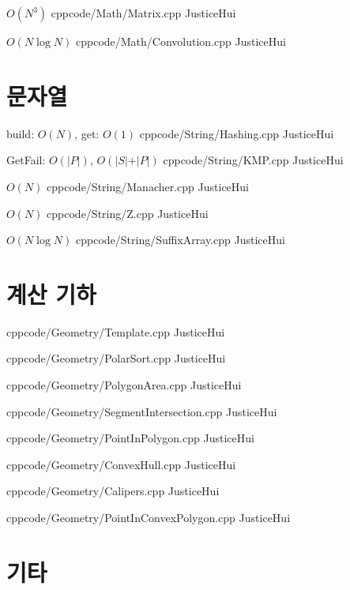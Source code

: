 \documentclass[landscape, 8pt, a4paper, twocolumn]{extarticle} %
\begin{document}
{}{$O(N^3)$}
{cpp}{code/Math/Matrix.cpp}
{JusticeHui}

{}{$O(N \log N)$}
{cpp}{code/Math/Convolution.cpp}
{JusticeHui}

\section{문자열}

{}{build: $O(N)$, get: $O(1)$}
{cpp}{code/String/Hashing.cpp}
{JusticeHui}

{}{GetFail: $O(\vert P\vert)$, $O(\vert S\vert + \vert P\vert)$}
{cpp}{code/String/KMP.cpp}
{JusticeHui}

{}{$O(N)$}
{cpp}{code/String/Manacher.cpp}
{JusticeHui}

{}{$O(N)$}
{cpp}{code/String/Z.cpp}
{JusticeHui}

{}{$O(N \log N)$}
{cpp}{code/String/SuffixArray.cpp}
{JusticeHui}

\section{계산 기하}

{}{}
{cpp}{code/Geometry/Template.cpp}
{JusticeHui}

{}{}
{cpp}{code/Geometry/PolarSort.cpp}
{JusticeHui}

{}{}
{cpp}{code/Geometry/PolygonArea.cpp}
{JusticeHui}

{}{}
{cpp}{code/Geometry/SegmentIntersection.cpp}
{JusticeHui}

{}{}
{cpp}{code/Geometry/PointInPolygon.cpp}
{JusticeHui}

{}{}
{cpp}{code/Geometry/ConvexHull.cpp}
{JusticeHui}

{}{}
{cpp}{code/Geometry/Calipers.cpp}
{JusticeHui}

{}{}
{cpp}{code/Geometry/PointInConvexPolygon.cpp}
{JusticeHui}

\section{기타}
\end{document}
